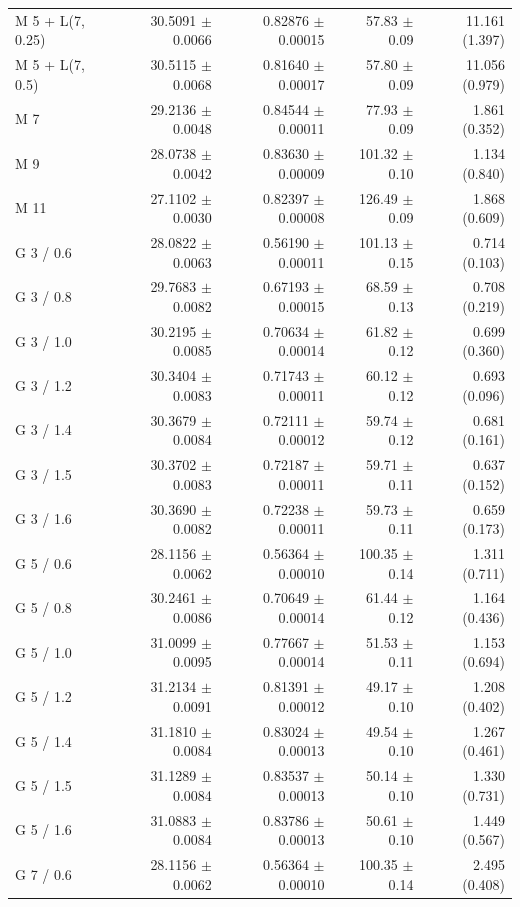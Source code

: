 \begin{longtable}{lrrrr}
M 5 + L(7, 0.25) & 30.5091 $\pm$ 0.0066 & 0.82876 $\pm$ 0.00015 & 57.83 $\pm$ 0.09 & 11.161 (1.397) \\
M 5 + L(7, 0.5) & 30.5115 $\pm$ 0.0068 & 0.81640 $\pm$ 0.00017 & 57.80 $\pm$ 0.09 & 11.056 (0.979) \\
M 7 & 29.2136 $\pm$ 0.0048 & 0.84544 $\pm$ 0.00011 & 77.93 $\pm$ 0.09 & 1.861 (0.352) \\
M 9 & 28.0738 $\pm$ 0.0042 & 0.83630 $\pm$ 0.00009 & 101.32 $\pm$ 0.10 & 1.134 (0.840) \\
M 11 & 27.1102 $\pm$ 0.0030 & 0.82397 $\pm$ 0.00008 & 126.49 $\pm$ 0.09 & 1.868 (0.609) \\
G 3 / 0.6 & 28.0822 $\pm$ 0.0063 & 0.56190 $\pm$ 0.00011 & 101.13 $\pm$ 0.15 & 0.714 (0.103) \\
G 3 / 0.8 & 29.7683 $\pm$ 0.0082 & 0.67193 $\pm$ 0.00015 & 68.59 $\pm$ 0.13 & 0.708 (0.219) \\
G 3 / 1.0 & 30.2195 $\pm$ 0.0085 & 0.70634 $\pm$ 0.00014 & 61.82 $\pm$ 0.12 & 0.699 (0.360) \\
G 3 / 1.2 & 30.3404 $\pm$ 0.0083 & 0.71743 $\pm$ 0.00011 & 60.12 $\pm$ 0.12 & 0.693 (0.096) \\
G 3 / 1.4 & 30.3679 $\pm$ 0.0084 & 0.72111 $\pm$ 0.00012 & 59.74 $\pm$ 0.12 & 0.681 (0.161) \\
G 3 / 1.5 & 30.3702 $\pm$ 0.0083 & 0.72187 $\pm$ 0.00011 & 59.71 $\pm$ 0.11 & 0.637 (0.152) \\
G 3 / 1.6 & 30.3690 $\pm$ 0.0082 & 0.72238 $\pm$ 0.00011 & 59.73 $\pm$ 0.11 & 0.659 (0.173) \\
G 5 / 0.6 & 28.1156 $\pm$ 0.0062 & 0.56364 $\pm$ 0.00010 & 100.35 $\pm$ 0.14 & 1.311 (0.711) \\
G 5 / 0.8 & 30.2461 $\pm$ 0.0086 & 0.70649 $\pm$ 0.00014 & 61.44 $\pm$ 0.12 & 1.164 (0.436) \\
G 5 / 1.0 & 31.0099 $\pm$ 0.0095 & 0.77667 $\pm$ 0.00014 & 51.53 $\pm$ 0.11 & 1.153 (0.694) \\
G 5 / 1.2 & 31.2134 $\pm$ 0.0091 & 0.81391 $\pm$ 0.00012 & 49.17 $\pm$ 0.10 & 1.208 (0.402) \\
G 5 / 1.4 & 31.1810 $\pm$ 0.0084 & 0.83024 $\pm$ 0.00013 & 49.54 $\pm$ 0.10 & 1.267 (0.461) \\
G 5 / 1.5 & 31.1289 $\pm$ 0.0084 & 0.83537 $\pm$ 0.00013 & 50.14 $\pm$ 0.10 & 1.330 (0.731) \\
G 5 / 1.6 & 31.0883 $\pm$ 0.0084 & 0.83786 $\pm$ 0.00013 & 50.61 $\pm$ 0.10 & 1.449 (0.567) \\
G 7 / 0.6 & 28.1156 $\pm$ 0.0062 & 0.56364 $\pm$ 0.00010 & 100.35 $\pm$ 0.14 & 2.495 (0.408) \\

\end{longtable}
